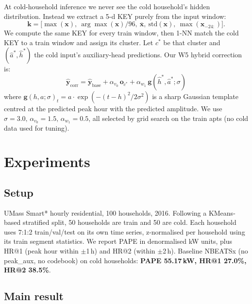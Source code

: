\documentclass[conference]{IEEEtran}
\begin{document}
At cold-household inference we never see the cold household's hidden
distribution. Instead we extract a 5-d KEY purely from the input window:
\[
\mathbf{k} = \big[\max(\mathbf{x}),\
\arg\max(\mathbf{x})/96,\
\overline{\mathbf{x}},\
\mathrm{std}(\mathbf{x}),\
\max(\mathbf{x}_{-24:})\big].
\]
We compute the same KEY for every train window, then 1-NN match the cold
KEY to a train window and assign its cluster. Let $c^*$ be that cluster and
$(\hat a^*, \hat h^*)$ the cold input's auxiliary-head predictions. Our W5
hybrid correction is:
\begin{equation}
\hat{\mathbf{y}}_{\text{corr}} = \hat{\mathbf{y}}_{\text{base}} +
\alpha_{v_0}\,\mathbf{o}_{c^*} +
\alpha_{w_1}\,\mathbf{g}(\hat h^*, \hat a^*; \sigma)
\label{eq:w5}
\end{equation}
where $\mathbf{g}(h,a;\sigma)_t = a\cdot\exp(-(t-h)^2/2\sigma^2)$ is a sharp
Gaussian template centred at the predicted peak hour with the predicted
amplitude. We use $\sigma=3.0,\,\alpha_{v_0}=1.5,\,\alpha_{w_1}=0.5$, all
selected by grid search on the train apts (no cold data used for tuning).

\section{Experiments}\label{sec:exp}

\subsection{Setup}\label{sec:setup}

UMass Smart* hourly residential, 100 households, 2016. Following a
KMeans-based stratified split, 50 households are train and 50 are cold.
Each household uses 7:1:2 train/val/test on its own time series,
z-normalised per household using its train segment statistics. We report
PAPE in denormalised kW units, plus HR@1 (peak hour within $\pm$1\,h) and
HR@2 (within $\pm$2\,h). Baseline NBEATSx (no peak\_aux, no codebook) on
cold households: \textbf{PAPE 55.17\,kW, HR@1 27.0\%, HR@2 38.5\%}.

\subsection{Main result}\label{sec:main}
\end{document}
